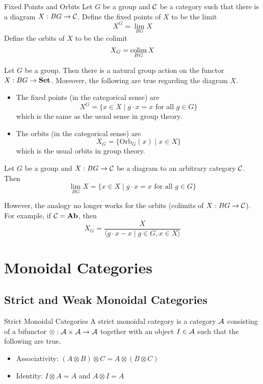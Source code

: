 \documentclass[a4paper]{article}
\begin{document}
\begin{defn}{Fixed Points and Orbits}{} Let $G$ be a group and $\mathcal{C}$ be a category such that there is a diagram $X:BG\to\mathcal{C}$. Define the fixed points of $X$ to be the limit $$X^G=\lim_{BG}X$$ Define the orbits of $X$ to be the colimit $$X_G=\operatorname*{colim}_{BG}X$$
\end{defn}

\begin{thm}{}{} Let $G$ be a group. Then there is a natural group action on the functor $X:BG\to\bold{Set}$. Moreover, the following are true regarding the diagram $X$. 
\begin{itemize}
\item The fixed points (in the categorical sense) are $$X^G=\{x\in X\;|\;g\cdot x=x\text{ for all }g\in G\}$$ which is the same as the usual sense in group theory. 
\item The orbits (in the categorical sense) are $$X_G=\{\text{Orb}_G(x)\;|\;x\in X\}$$ which is the usual orbits in group theory. 
\end{itemize}
\end{thm}

\begin{prp}{}{} Let $G$ be a group and $X:BG\to\mathcal{C}$ be a diagram to an arbitrary category $\mathcal{C}$. Then $$\lim_{BG}X=\{x\in X\;|\;g\cdot x=x\text{ for all }g\in G\}$$
\end{prp}

However, the analogy no longer works for the orbits (colimits of $X:BG\to\mathcal{C}$). For example, if $\mathcal{C}=\bold{Ab}$, then $$X_G=\frac{X}{\langle g\cdot x-x\;|\;g\in G,x\in X\rangle}$$


\pagebreak
\section{Monoidal Categories}
\subsection{Strict and Weak Monoidal Categories}
\begin{defn}{Strict Monoidal Categories}{} A strict monoidal category is a category $\mathcal{A}$ consisting of a bifunctor $\otimes:\mathcal{A}\times\mathcal{A}\to\mathcal{A}$ together with an object $I\in\mathcal{A}$ such that the following are true. 
\begin{itemize}
\item Associativity: $(A\otimes B)\otimes C=A\otimes(B\otimes C)$
\item Identity: $I\otimes A=A$ and $A\otimes I=A$
\end{itemize}
\end{defn}
\end{document}
